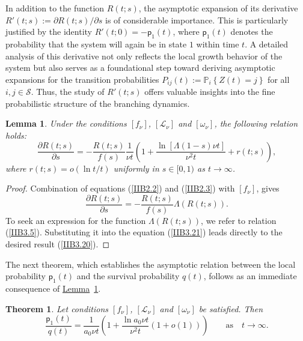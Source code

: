 \documentclass[10pt,reqno]{amsart}
\newtheorem{theorem}{Theorem}
\newtheorem{lemma}{Lemma}
\theoremstyle{definition}
\numberwithin{equation}{section}
\begin{document}
    In addition to the function $R(t;s)$, the asymptotic expansion of its derivative
    ${R}'(t;s):={\partial{R(t;s)}}\big/{\partial{s}}$ is of considerable importance. This is particularly justified
    by the identity ${R}'(t;0)=-{\textsf{p}_1}(t)$, where ${\textsf{p}_1}(t)$ denotes the probability that the system
    will again be in state $1$ within time $t$. A detailed analysis of this derivative not only reflects the local
    growth behavior of the system but also serves as a foundational step toward deriving asymptotic expansions for
    the transition probabilities ${{P}_{ij}}(t):={{\mathbb{P}}_{i}}\left\{Z(t)=j\right\}$ for all $i,j\in\mathcal{S}$.
    Thus, the study of ${R}'(t;s)$ offers valuable insights into the fine probabilistic structure of the branching dynamics.

\begin{lemma}                  \label{IIBLem2}
    Under the conditions $[{f}_{\nu}]$, $[{\mathcal{L}}_{\nu}]$ and $[{\omega}_{\nu}]$, the following relation holds:
\begin{equation}                             \label{IIB3.20}
    \frac{\partial{R(t;s)}}{\partial{s}}=-\frac{R(t;s)}{f(s)}\frac{1}{\nu{t}}
    \left(1+\frac{\ln\left[\Lambda(1-s)\nu{t}\right]}{{{\nu}^2}t}+r(t;s)\right),
\end{equation}
    where $r(t;s)=o\left({\ln{t}}/{t}\right)$ uniformly in $s\in[0,1)$ as $t\to\infty$.
\end{lemma}

\begin{proof}
    Combination of equations {(\ref{IIB2.2})} and {(\ref{IIB2.3})} with $[{f}_{\nu}]$, gives
\begin{equation}                  \label{IIB3.21}
    \frac{\partial{R(t;s)}}{\partial{s}}=-\frac{R(t;s)}{f(s)}\Lambda\left(R(t;s)\right).
\end{equation}
    To seek an expression for the function $\Lambda(R(t;s))$, we refer to relation {(\ref{IIB3.5})}.
    Substituting it into the equation {(\ref{IIB3.21})} leads directly to the desired result {(\ref{IIB3.20})}.
\end{proof}

    The next theorem, which establishes the asymptotic relation between the local probability ${\textsf{p}_1}(t)$
    and the survival probability $q(t)$, follows as an immediate consequence of {\hyperref[IIBLem2]{Lemma}~\ref{IIBLem2}}.

\begin{theorem}                      \label{IIBTh2}
    Let conditions $[{f}_{\nu}]$, $[{\mathcal{L}}_{\nu}]$ and $[{\omega}_{\nu}]$ be satisfied. Then
\begin{equation}                  \label{IIB3.22}
    \frac{{\textsf{p}_1}(t)}{q(t)}=\frac{1}{{a_{0}}\nu{t}}\left(1+\frac{\ln{a_{0}}\nu{t}}{{{\nu}^{2}}t}
    \left(1+o(1)\right)\right) \qquad {\text{as}} \quad {t\to\infty}.
\end{equation}
\end{theorem}
\end{document}
